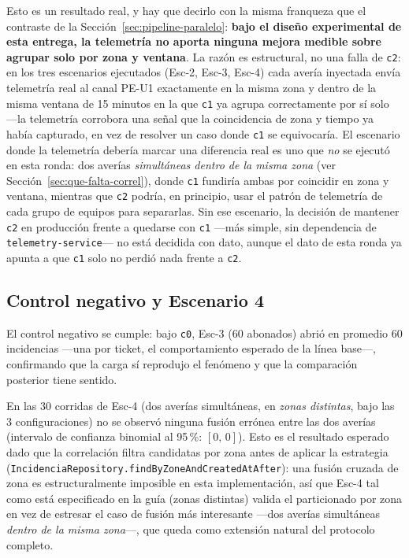 Esto es un resultado real, y hay que decirlo con la misma franqueza que el contraste de la
Sección~\ref{sec:pipeline-paralelo}: \textbf{bajo el diseño experimental de esta entrega, la
telemetría no aporta ninguna mejora medible sobre agrupar solo por zona y ventana}. La razón es
estructural, no una falla de \texttt{c2}: en los tres escenarios ejecutados (Esc-2, Esc-3, Esc-4)
cada avería inyectada envía telemetría real al canal PE-U1 exactamente en la misma zona y dentro
de la misma ventana de 15 minutos en la que \texttt{c1} ya agrupa correctamente por sí solo —la
telemetría corrobora una señal que la coincidencia de zona y tiempo ya había capturado, en vez de
resolver un caso donde \texttt{c1} se equivocaría. El escenario donde la telemetría debería
marcar una diferencia real es uno que \emph{no} se ejecutó en esta ronda: dos averías
\emph{simultáneas dentro de la misma zona} (ver Sección~\ref{sec:que-falta-correl}), donde \texttt{c1}
fundiría ambas por coincidir en zona y ventana, mientras que \texttt{c2} podría, en principio,
usar el patrón de telemetría de cada grupo de equipos para separarlas. Sin ese escenario, la
decisión de mantener \texttt{c2} en producción frente a quedarse con \texttt{c1} —más simple, sin
dependencia de \texttt{telemetry-service}— no está decidida con dato, aunque el dato de esta
ronda ya apunta a que \texttt{c1} solo no perdió nada frente a \texttt{c2}.

\subsection{Control negativo y Escenario 4}

El control negativo se cumple: bajo \texttt{c0}, Esc-3 (60 abonados) abrió en promedio 60
incidencias —una por ticket, el comportamiento esperado de la línea base—, confirmando que la
carga sí reprodujo el fenómeno y que la comparación posterior tiene sentido.

En las 30 corridas de Esc-4 (dos averías simultáneas, en \emph{zonas distintas}, bajo las 3
configuraciones) no se observó ninguna fusión errónea entre las dos averías (intervalo de
confianza binomial al 95\,\%: $[0,\,0]$). Esto es el resultado esperado dado que la correlación
filtra candidatas por zona antes de aplicar la estrategia
(\texttt{IncidenciaRepository.findByZoneAndCreatedAtAfter}): una fusión cruzada de zona es
estructuralmente imposible en esta implementación, así que Esc-4 tal como está especificado en
la guía (zonas distintas) valida el particionado por zona en vez de estresar el caso de fusión
más interesante —dos averías simultáneas \emph{dentro de la misma zona}—, que queda como
extensión natural del protocolo completo.

